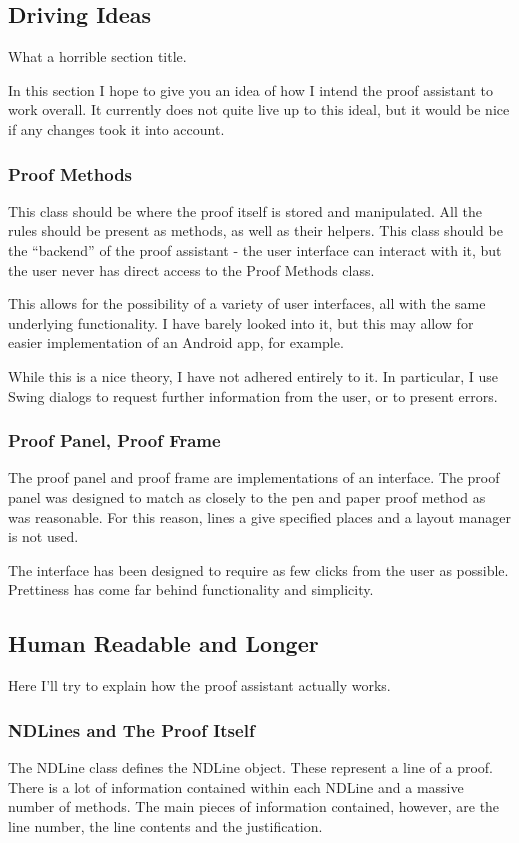\documentclass[a4paper]{article}
\begin{document}
\subsection{Driving Ideas}
What a horrible section title.

In this section I hope to give you an idea of how I intend the proof assistant to work overall. It currently does not quite live up to this ideal, but it would be nice if any changes took it into account.

\subsubsection{Proof Methods}
This class should be where the proof itself is stored and manipulated. All the rules should be present as methods, as well as their helpers. This class should be the ``backend'' of the proof assistant - the user interface can interact with it, but the user never has direct access to the Proof Methods class.

This allows for the possibility of a variety of user interfaces, all with the same underlying functionality. I have barely looked into it, but this may allow for easier implementation of an Android app, for example.

While this is a nice theory, I have not adhered entirely to it. In particular, I use Swing dialogs to request further information from the user, or to present errors.

\subsubsection{Proof Panel, Proof Frame}
The proof panel and proof frame are implementations of an interface. The proof panel was designed to match as closely to the pen and paper proof method as was reasonable. For this reason, lines a give specified places and a layout manager is not used.

The interface has been designed to require as few clicks from the user as possible. Prettiness has come far behind functionality and simplicity.


\subsection{Human Readable and Longer}
Here I'll try to explain how the proof assistant actually works.

\subsubsection{NDLines and The Proof Itself}
The NDLine class defines the NDLine object. These represent a line of a proof. There is a lot of information contained within each NDLine and a massive number of methods. The main pieces of information contained, however, are the line number, the line contents and the justification.
\end{document}
